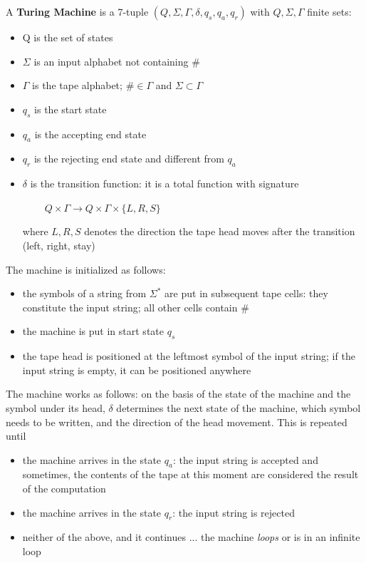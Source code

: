 \begin{definition}
A {\bf Turing Machine} is a 7-tuple
%
$(Q, \Sigma, \Gamma, \delta, q_s, q_a, q_r)$
%
with $Q, \Sigma, \Gamma$ finite sets:

\begin{itemize}
\item
Q is the set of states

\item
$\Sigma$ is an input alphabet not containing \#

\item
$\Gamma$ is the tape alphabet; $\# \in \Gamma$ and $\Sigma \subset \Gamma$

\item
$q_s$ is the start state

\item
$q_a$ is the accepting end state


\item
$q_r$ is the rejecting end state and different from $q_a$


\item
$\delta$ is the transition function: it is a total function with
  signature

$~~~~~~~~~~Q \times \Gamma \rightarrow Q \times \Gamma \times \{L,R,S\}$

where $L, R, S$ denotes the direction the tape head moves after the transition (left, right, stay)

\end{itemize}
\end{definition}

The machine is initialized as follows:
\begin{itemize}
\item the symbols of a string from $\Sigma^*$ are put in subsequent
tape cells: they constitute the input string; all other cells contain
\#
\item the machine is put in start state $q_s$
\item the tape head is positioned at the leftmost symbol of the input
  string; if the input string is empty, it can be positioned anywhere
\end{itemize}

The machine works as follows: on the basis of the state of the
machine and the symbol under its head, $\delta$ determines the next
state of the machine, which symbol needs to be written, and the
direction of the head movement. This is repeated until
\begin{itemize}
\item the machine arrives in the state $q_a$: the input string is
  accepted and sometimes, the contents of the tape at this moment are
  considered the result of the computation
\item the machine arrives in the state $q_r$: the input string is
 rejected
\item neither of the above, and it continues ... the machine {\em
  loops} or is in an infinite loop
\end{itemize}

